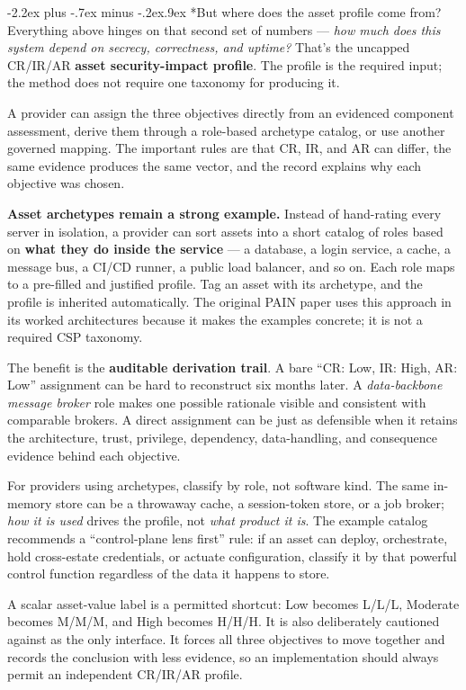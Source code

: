 \documentclass[11pt]{article}
\makeatletter
\renewcommand\section{\@startsection{section}{1}{\z@}%
  {-2.2ex plus -.7ex minus -.2ex}{.9ex}%
  {\normalfont\Large\bfseries}}
\makeatother
\begin{document}
\section*{But where does the asset profile come from?}
Everything above hinges on that second set of numbers --- \emph{how much does this
system depend on secrecy, correctness, and uptime?} That's the uncapped CR/IR/AR
\textbf{asset security-impact profile}. The profile is the required input; the
method does not require one taxonomy for producing it.

A provider can assign the three objectives directly from an evidenced component
assessment, derive them through a role-based archetype catalog, or use another
governed mapping. The important rules are that CR, IR, and AR can differ, the same
evidence produces the same vector, and the record explains why each objective was
chosen.

\textbf{Asset archetypes remain a strong example.} Instead of hand-rating every
server in isolation, a provider can sort assets into a short catalog of roles based
on \textbf{what they do inside the service} --- a database, a login service, a
cache, a message bus, a CI/CD runner, a public load balancer, and so on. Each role
maps to a pre-filled and justified profile. Tag an asset with its archetype, and the
profile is inherited automatically. The original PAIN paper uses this approach in
its worked architectures because it makes the examples concrete; it is not a
required CSP taxonomy.

The benefit is the \textbf{auditable derivation trail}. A bare ``CR: Low, IR: High,
AR: Low'' assignment can be hard to reconstruct six months later. A
\emph{data-backbone message broker} role makes one possible rationale visible and
consistent with comparable brokers. A direct assignment can be just as defensible
when it retains the architecture, trust, privilege, dependency, data-handling, and
consequence evidence behind each objective.

For providers using archetypes, classify by role, not software kind. The same
in-memory store can be a throwaway cache, a session-token store, or a job broker;
\emph{how it is used} drives the profile, not \emph{what product it is}. The example
catalog recommends a ``control-plane lens first'' rule: if an asset can deploy,
orchestrate, hold cross-estate credentials, or actuate configuration, classify it
by that powerful control function regardless of the data it happens to store.

A scalar asset-value label is a permitted shortcut: Low becomes L/L/L, Moderate
becomes M/M/M, and High becomes H/H/H. It is also deliberately cautioned against
as the only interface. It forces all three objectives to move together and records
the conclusion with less evidence, so an implementation should always permit an
independent CR/IR/AR profile.
\end{document}
